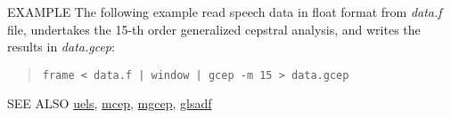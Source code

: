 \begin{qsection}{EXAMPLE}
The following example read speech data in float format from {\em data.f}
file, undertakes the 15-th order generalized cepstral analysis,
and writes the results in {\em data.gcep}:
\begin{quote}
 \verb!frame < data.f | window | gcep -m 15 > data.gcep!
\end{quote} 
\end{qsection}

\begin{qsection}{SEE ALSO}
\hyperlink{uels}{uels},
\hyperlink{mcep}{mcep},
\hyperlink{mgcep}{mgcep},
\hyperlink{glsadf}{glsadf}
\end{qsection}
